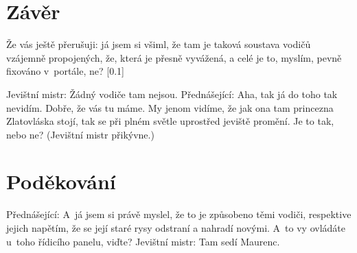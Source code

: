 \documentclass{cygclanek}
\begin{document}
\section{Závěr}
Že vás ještě přerušuji: já jsem si všiml, že tam je taková soustava vodičů vzájemně propojených, že, která je přesně vyvážená, a celé je to, myslím, pevně fixováno v~portále, ne?
[0.1]

Jevištní mistr: Žádný vodiče tam nejsou. Přednášející: Aha, tak já do toho tak nevidím. Dobře, že vás tu máme. My jenom vidíme, že jak ona tam princezna Zlatovláska stojí, tak se při plném světle uprostřed jeviště promění. Je to tak, nebo ne? (Jevištní mistr přikývne.)
\section*{Poděkování}
Přednášející: A~já jsem si právě myslel, že to je způsobeno těmi vodiči, respektive jejich napětím, že se její staré rysy odstraní a nahradí novými. A~to vy ovládáte u~toho řídicího panelu, viďte? Jevištní mistr: Tam sedí Maurenc.



\printbibliography[title={Literatura}]
\end{document}
